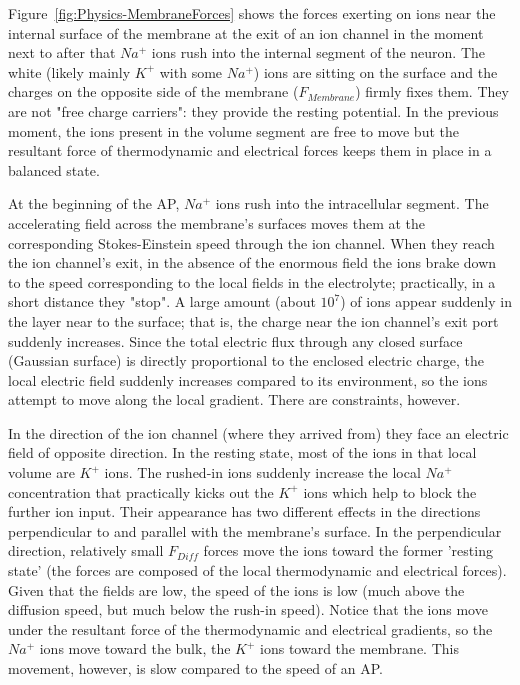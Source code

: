 \documentclass[]{article}
\begin{document}
Figure~\ref{fig:Physics-MembraneForces} shows the forces exerting on ions 
near the internal surface of the membrane 
at the exit of an ion channel
in the moment next to after that
$Na^+$ ions rush into the internal segment of the neuron.
The white (likely mainly $K^+$ with some $Na^+$) ions are sitting on the surface and the charges on the opposite side of the membrane ($F_{Membrane}$) firmly fixes them. They are not "free charge carriers": they provide the resting potential. In the previous moment, the ions present in the volume segment are free to move but the resultant force of thermodynamic and electrical forces keeps them in place
in a balanced state.
	
At the beginning of the AP, $Na^+$ ions rush into the intracellular segment. The accelerating field across the membrane's surfaces moves them at the corresponding Stokes-Einstein speed through the ion channel.
When they reach the ion channel's exit,
in the absence of the enormous field the
ions brake down to the speed corresponding to the
local fields in the electrolyte; practically, in a short distance they "stop".
A large amount (about $10^7$) of ions appear suddenly
in the layer near to the surface;
that is, the charge near the ion channel's exit port
suddenly increases. Since
the total electric flux through any closed surface (Gaussian surface) is directly proportional to the enclosed electric charge, the local electric field suddenly increases compared to its environment, so the ions attempt to move along the local gradient. 
There are constraints, however.

In the direction of the ion channel (where they arrived from) they face an electric field of opposite direction.
In the resting state, most of the ions in that local volume are $K^+$ ions.
The rushed-in ions suddenly increase the local $Na^+$
concentration that practically kicks out the $K^+$ ions
which help to block the further ion input.
Their appearance has two different effects
in the directions perpendicular to and parallel with
the membrane's surface.
In the perpendicular direction,
relatively small $F_{Diff}$ forces move the ions
toward the former 'resting state' (the forces are composed
of the local thermodynamic and electrical forces).
Given that the fields are low, the speed of the ions
is low (much above the diffusion speed, but much below the rush-in speed).
Notice that the ions move under the resultant force
of the thermodynamic and electrical gradients, so the
$Na^+$ ions move toward the bulk, the $K^+$ ions
toward the membrane. This movement, however, is slow
compared to the speed of an AP.
\end{document}
